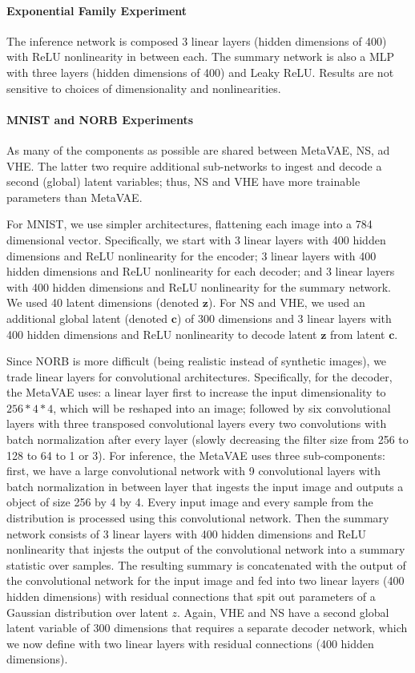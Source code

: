 \paragraph{Exponential Family Experiment} The inference network is composed 3 linear layers  (hidden dimensions of 400) with ReLU nonlinearity in between each. The summary network is also a MLP with three layers (hidden dimensions of 400) and Leaky ReLU. Results are not sensitive to choices of dimensionality and nonlinearities.

\paragraph{MNIST and NORB Experiments} As many of the components as possible are shared between MetaVAE, NS, ad VHE. The latter two require additional sub-networks to ingest and decode a second (global) latent variables; thus, NS and VHE have more trainable parameters than MetaVAE. 

For MNIST, we use simpler architectures, flattening each image into a 784 dimensional vector. Specifically, we start with 3 linear layers with 400 hidden dimensions and ReLU nonlinearity for the encoder; 3 linear layers with 400 hidden dimensions and ReLU nonlinearity for each decoder; and 3 linear layers with 400 hidden dimensions and ReLU nonlinearity for the summary network. We used 40 latent dimensions (denoted $\mathbf{z}$). For NS and VHE, we used an additional global latent (denoted $\mathbf{c}$) of 300 dimensions and 3 linear layers with 400 hidden dimensions and ReLU nonlinearity to decode latent $\mathbf{z}$ from latent $\mathbf{c}$. 

Since NORB is more difficult (being realistic instead of synthetic images), we trade linear layers for convolutional architectures. Specifically, for the decoder, the MetaVAE uses: a linear layer first to increase the input dimensionality to $256*4*4$, which will be reshaped into an image; followed by six convolutional layers with three transposed convolutional layers every two convolutions with batch normalization after every layer (slowly decreasing the filter size from 256 to 128 to 64 to 1 or 3). For inference, the MetaVAE uses three sub-components: first, we have a large convolutional network with 9 convolutional layers with batch normalization in between layer that ingests the input image and outputs a object of size 256 by 4 by 4. Every input image and every sample from the distribution is processed using this convolutional network. Then the summary network consists of 3 linear layers with 400 hidden dimensions and ReLU nonlinearity that injests the output of the convolutional network into a summary statistic over samples. The resulting summary is concatenated with the output of the convolutional network for the input image and fed into two linear layers (400 hidden dimensions) with residual connections that spit out parameters of a Gaussian distribution over latent $z$. Again, VHE and NS have a second global latent variable of 300 dimensions that requires a separate decoder network, which we now define with two linear layers with residual connections (400 hidden dimensions).

